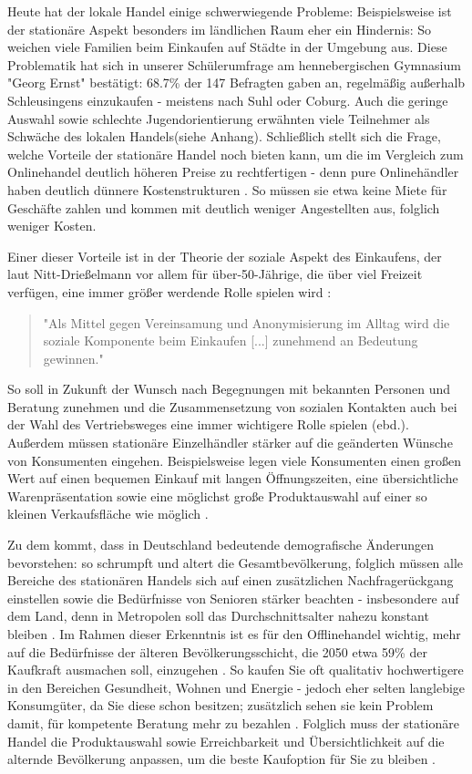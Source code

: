 \begin{folding}
Heute hat der lokale Handel einige schwerwiegende Probleme: 
Beispielsweise ist der stationäre Aspekt besonders im ländlichen Raum eher ein Hindernis: So weichen viele Familien beim Einkaufen auf Städte in der Umgebung aus. Diese Problematik hat sich in unserer Schülerumfrage am hennebergischen Gymnasium "Georg Ernst" bestätigt: 68.7\% der 147 Befragten gaben an, regelmäßig außerhalb Schleusingens einzukaufen - meistens nach Suhl oder Coburg. 
Auch die geringe Auswahl sowie schlechte Jugendorientierung erwähnten viele Teilnehmer als Schwäche des lokalen Handels(siehe Anhang). Schließlich stellt sich die Frage, welche Vorteile der stationäre Handel noch bieten kann, um die im Vergleich zum Onlinehandel deutlich höheren Preise zu rechtfertigen - denn pure Onlinehändler haben deutlich dünnere Kostenstrukturen \cite[S. 14]{evilcom}. So müssen sie etwa keine Miete für Geschäfte zahlen und kommen mit deutlich weniger Angestellten aus, folglich weniger Kosten. 

Einer dieser Vorteile ist in der Theorie der soziale Aspekt des Einkaufens, der laut Nitt-Drießelmann vor allem für über-50-Jährige, die über viel Freizeit verfügen, eine immer größer werdende Rolle spielen wird \cite[S. 43f]{Nitt}:
\begin{quote}
"Als Mittel gegen Vereinsamung und Anonymisierung im Alltag wird die soziale Komponente beim Einkaufen [...] zunehmend an Bedeutung gewinnen." \cite[S. 43]{Nitt}
\end{quote} 
So soll in Zukunft der Wunsch nach Begegnungen mit bekannten Personen und Beratung zunehmen und die Zusammensetzung von sozialen Kontakten auch bei der Wahl des Vertriebsweges eine immer wichtigere Rolle spielen (ebd.).
Außerdem müssen stationäre Einzelhändler stärker auf die geänderten Wünsche von Konsumenten eingehen. Beispielsweise legen viele Konsumenten einen großen Wert auf einen bequemen Einkauf mit langen Öffnungszeiten, eine übersichtliche Warenpräsentation sowie eine möglichst große Produktauswahl auf einer so kleinen Verkaufsfläche wie möglich \cite[S. 61]{Nitt}.

Zu dem kommt, dass in Deutschland bedeutende demografische Änderungen bevorstehen: so schrumpft und altert die Gesamtbevölkerung, folglich müssen alle Bereiche des stationären Handels sich auf einen zusätzlichen Nachfragerückgang einstellen sowie die Bedürfnisse von Senioren stärker beachten - insbesondere auf dem Land, denn in Metropolen soll das Durchschnittsalter nahezu konstant bleiben \cite[S. 32ff]{Nitt}. Im Rahmen dieser Erkenntnis ist es für den Offlinehandel wichtig, mehr auf die Bedürfnisse der älteren Bevölkerungsschicht, die 2050 etwa 59\% der Kaufkraft ausmachen soll, einzugehen \cite[S. 64]{Nitt}. So kaufen Sie oft qualitativ hochwertigere in den Bereichen Gesundheit, Wohnen und Energie - jedoch eher selten langlebige Konsumgüter, da Sie diese schon besitzen; zusätzlich sehen sie kein Problem damit, für kompetente Beratung mehr zu bezahlen \cite[S. 41f]{Nitt}. Folglich muss der stationäre Handel die Produktauswahl sowie Erreichbarkeit und Übersichtlichkeit auf die alternde Bevölkerung anpassen, um die beste Kaufoption für Sie zu bleiben \cite[S. 64]{Nitt}.


\end{folding}
